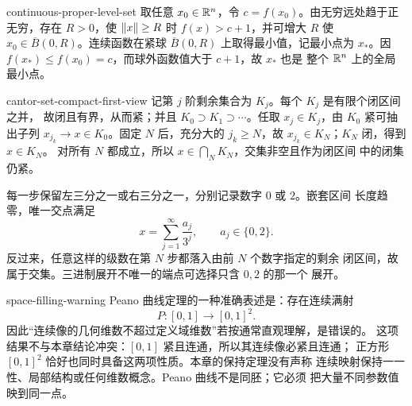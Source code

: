 \begin{solution}{continuous-proper-level-set}
取任意 \(x_0\in\mathbb{R}^n\)，令 \(c=f(x_0)\)。由无穷远处趋于正无穷，存在
\(R>0\)，使 \(\left\lVert x\right\rVert\ge R\) 时 \(f(x)>c+1\)，并可增大 \(R\) 使
\(x_0\in\overline B(0,R)\)。连续函数在紧球
\(\overline B(0,R)\) 上取得最小值，记最小点为 \(x_*\)。因
\(f(x_*)\le f(x_0)=c\)，而球外函数值大于 \(c+1\)，故 \(x_*\) 也是
整个 \(\mathbb{R}^n\) 上的全局最小点。
\end{solution}

\begin{solution}{cantor-set-compact-first-view}
记第 \(j\) 阶剩余集合为 \(K_j\)。每个 \(K_j\) 是有限个闭区间之并，
故闭且有界，从而紧；并且
\(K_0\supset K_1\supset\cdots\)。任取 \(x_j\in K_j\)，由 \(K_0\)
紧可抽出子列 \(x_{j_k}\to x\in K_0\)。固定 \(N\) 后，充分大的
\(j_k\ge N\)，故 \(x_{j_k}\in K_N\)；\(K_N\) 闭，得到 \(x\in K_N\)。
对所有 \(N\) 都成立，所以 \(x\in\bigcap_NK_N\)，交集非空且作为闭区间
中的闭集仍紧。

每一步保留左三分之一或右三分之一，分别记录数字 \(0\) 或 \(2\)。嵌套区间
长度趋零，唯一交点满足
\[
 x=\sum_{j=1}^{\infty}\frac{a_j}{3^j},
 \qquad a_j\in\{0,2\}.
\]
反过来，任意这样的级数在第 \(N\) 步都落入由前 \(N\) 个数字指定的剩余
闭区间，故属于交集。三进制展开不唯一的端点可选择只含 \(0,2\) 的那一个
展开。
\end{solution}

\begin{solution}{space-filling-warning}
Peano 曲线定理的一种准确表述是：存在连续满射
\[
 P:[0,1]\longrightarrow[0,1]^2.
\]
因此“连续像的几何维数不超过定义域维数”若按通常直观理解，是错误的。
这项结果不与本章结论冲突：\([0,1]\) 紧且连通，所以其连续像必紧且连通；
正方形 \([0,1]^2\) 恰好也同时具备这两项性质。本章的保持定理没有声称
连续映射保持一一性、局部结构或任何维数概念。Peano 曲线不是同胚；它必须
把大量不同参数值映到同一点。
\end{solution}
